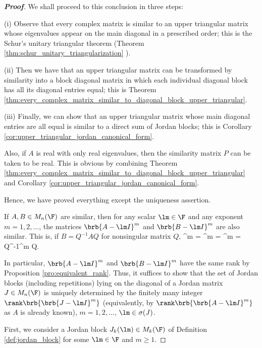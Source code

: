 \begin{proof}[\bf Proof]
We shall proceed to this conclusion in three steps:
\ben
\item [(i)] Observe that every complex matrix is similar to an upper triangular matrix whose eigenvalues appear on the main diagonal in a prescribed order; this is the Schur's unitary triangular
    theorem (Theorem \ref{thm:schur_unitary_triangularization} ).

\item [(ii)] Then we have that an upper triangular matrix can be transformed by similarity into a block diagonal matrix in which each individual diagonal block has all its diagonal entries equal;
    this is Theorem \ref{thm:every_complex_matrix_similar_to_diagonal_block_upper_triangular}.

\item [(iii)] Finally, we can show that an upper triangular matrix whose main diagonal entries are all equal is similar to a direct sum of Jordan blocks; this is Corollary
    \ref{cor:upper_triangular_jordan_canonical_form}.
\een

Also, if $A$ is real with only real eigenvalues, then the similarity matrix $P$ can be taken to be real. This is obvious by combining Theorem
\ref{thm:every_complex_matrix_similar_to_diagonal_block_upper_triangular} and Corollary \ref{cor:upper_triangular_jordan_canonical_form}.

Hence, we have proved everything except the uniqueness assertion.

If $A,B\in M_n(\F)$ are similar, then for any scalar $\lm \in \F$ and any exponent $m=1,2,\dots$, the matrices $\brb{A - \lm I}^m$ and $\brb{B - \lm I}^m$ are also similar. This is, if $B =
Q^{-1}AQ$ for nonsingular matrix $Q$,
\be
{}^m = ^m = ^m = Q^{-1}^m Q.
\ee

In particular, $\brb{A - \lm I}^m$ and $\brb{B - \lm I}^m$ have the same rank by Proposition \ref{pro:equivalent_rank}. Thus, it suffices to show that the set of Jordan blocks (including repetitions)
lying on the diagonal of a Jordan matrix $J\in M_n(\F)$ is uniquely determined by the finitely many integer $\rank\brb{\brb{J-\lm I}^m}$ (equivalently, by $\rank\brb{\brb{A-\lm I}^m}$ as $A$ is already
known), $m = 1,2,\dots$, $\lm \in \sigma(J)$.

First, we consider a Jordan block $J_k(\lm) \in M_k(\F)$ of Definition \ref{def:jordan_block} for some $\lm \in \F$ and $m\geq 1$.


\end{proof}
